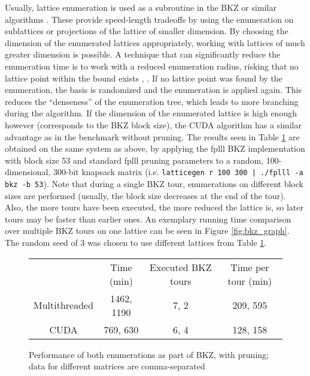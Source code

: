 \documentclass{scrartcl}
\begin{document}
    Usually, lattice enumeration is used as a subroutine in the BKZ or similar algorithms \cite{bkz}. 
    These provide speed-length tradeoffs by using the enumeration on sublattices or projections of the lattice of smaller dimension. 
    By choosing the dimension of the enumerated lattices appropriately, working with lattices of much greater dimension is possible. 
    A technique that can significantly reduce the enumeration time is to work with a reduced enumeration radius, risking that no lattice point within the bound exists \cite{pruning}, \cite{bkz2}. 
    If no lattice point was found by the enumeration, the basis is randomized and the enumeration is applied again. 
    This reduces the ``denseness'' of the enumeration tree, which leads to more branching during the algorithm. 
    If the dimension of the enumerated lattice is high enough however (corresponds to the BKZ block size), the CUDA algorithm has a similar advantage as in the benchmark without pruning. 
    The results seen in Table \ref{tab:pruning_bench} are obtained on the same system as above, by applying the fplll BKZ implementation with block size 53 and standard fplll pruning parameters to a random, 100-dimensional, 300-bit knapsack matrix (i.e. \texttt{latticegen r 100 300 | ./fplll -a bkz -b 53}). 
    Note that during a single BKZ tour, enumerations on different block sizes are performed (usually, the block size decreases at the end of the tour). 
    Also, the more tours have been executed, the more reduced the lattice is, so later tours may be faster than earlier ones. 
    An exemplary running time comparison over multiple BKZ tours on one lattice can be seen in Figure \ref{fig:bkz_graph}. 
    The random seed of 3 was chosen to use different lattices from Table \ref{tab:pruning_bench}.

    \begin{figure}
        \begin{tabular}{c c c c}
            ~ & Time (min) & Executed BKZ tours & Time per tour (min) \\
            Multithreaded & 1462, 1190 & 7, 2 & 209, 595 \\
            CUDA & 769, 630 & 6, 4 & 128, 158
        \end{tabular}
        \caption{Performance of both enumerations as part of BKZ, with pruning; data for different matrices are comma-separated\label{tab:pruning_bench}}
    \end{figure}
\end{document}
